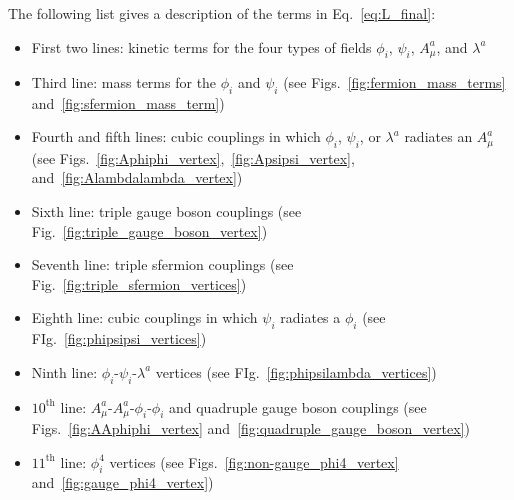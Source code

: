 \documentclass[dissertation.tex]{subfiles}
\begin{document}
The following list gives a description of the terms in Eq.~\ref{eq:L_final}:

\begin{itemize}
  \item First two lines: kinetic terms for the four types of fields $\phi_{i}$, $\psi_{i}$, $A_{\mu}^{a}$, and $\lambda^{a}$
  \item Third line: mass terms for the $\phi_{i}$ and $\psi_{i}$ (see Figs.~\ref{fig:fermion_mass_terms} and~\ref{fig:sfermion_mass_term})
  \item Fourth and fifth lines: cubic couplings in which $\phi_{i}$, $\psi_{i}$, or $\lambda^{a}$ radiates an $A_{\mu}^{a}$ (see Figs.~\ref{fig:Aphiphi_vertex},~\ref{fig:Apsipsi_vertex}, and~\ref{fig:Alambdalambda_vertex})
  \item Sixth line: triple gauge boson couplings (see Fig.~\ref{fig:triple_gauge_boson_vertex})
  \item Seventh line: triple sfermion couplings (see Fig.~\ref{fig:triple_sfermion_vertices})
  \item Eighth line: cubic couplings in which $\psi_{i}$ radiates a $\phi_{i}$ (see FIg.~\ref{fig:phipsipsi_vertices})
  \item Ninth line: $\phi_{i}$-$\psi_{i}$-$\lambda^{a}$ vertices (see FIg.~\ref{fig:phipsilambda_vertices})
  \item $10^{\mathrm{th}}$ line: $A_{\mu}^{a}$-$A_{\mu}^{a}$-$\phi_{i}$-$\phi_{i}$ and quadruple gauge boson couplings (see Figs.~\ref{fig:AAphiphi_vertex} and~\ref{fig:quadruple_gauge_boson_vertex})
  \item $11^{\mathrm{th}}$ line: $\phi_{i}^{4}$ vertices (see Figs.~\ref{fig:non-gauge_phi4_vertex} and~\ref{fig:gauge_phi4_vertex})
\end{itemize}
\end{document}
